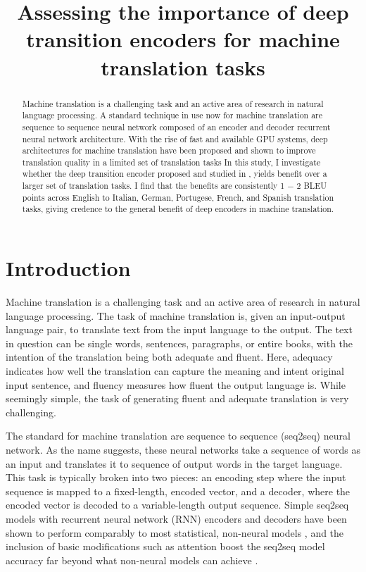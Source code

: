 \documentclass[twocolumn,superscriptaddress]{revtex4-1}
\begin{document}
\title{Assessing the importance of deep transition encoders for machine translation tasks}
\begin{abstract}
Machine translation is a challenging task and an active area of research in natural language processing.
A standard technique in use now for machine translation are sequence to sequence neural network composed of an encoder and decoder recurrent neural network architecture.
With the rise of fast and available GPU systems, deep architectures for machine translation have been proposed and shown to improve translation quality in a limited set of translation tasks \cite{DBLP:journals/corr/ChoMBB14, miceli-barone-etal-2017-deep}
In this study, I investigate whether the deep transition encoder proposed and studied in \cite{miceli-barone-etal-2017-deep}, yields benefit over a larger set of translation tasks.
I find that the benefits are consistently 1 $-$ 2 BLEU points across English to Italian, German, Portugese, French, and Spanish translation tasks, giving credence to the general benefit of deep encoders in machine translation. 
\end{abstract}
\maketitle

\section{Introduction}
Machine translation is a challenging task and an active area of research in natural language processing.
The task of machine translation is, given an input-output language pair, to translate text from the input language to the output.
The text in question can be single words, sentences, paragraphs, or entire books, with the intention of the translation being both adequate and fluent.
Here, adequacy indicates how well the translation can capture the meaning and intent original input sentence, and fluency measures how fluent the output language is.
While seemingly simple, the task of generating fluent and adequate translation is very challenging.

The standard for machine translation are sequence to sequence (seq2seq) neural network.
As the name suggests, these neural networks take a sequence of words as an input and translates it to sequence of output words in the target language.
This task is typically broken into two pieces: an encoding step where the input sequence is mapped to a fixed-length, encoded vector, and a decoder, where the encoded vector is decoded to a variable-length output sequence.
Simple seq2seq models with recurrent neural network (RNN) encoders and decoders have been shown to perform comparably to most statistical, non-neural models \cite{DBLP:journals/corr/ChoMBB14}, and the inclusion of basic modifications such as attention boost the seq2seq model accuracy far beyond what non-neural models can achieve \cite{bahdanau2016neural}.
\end{document}
